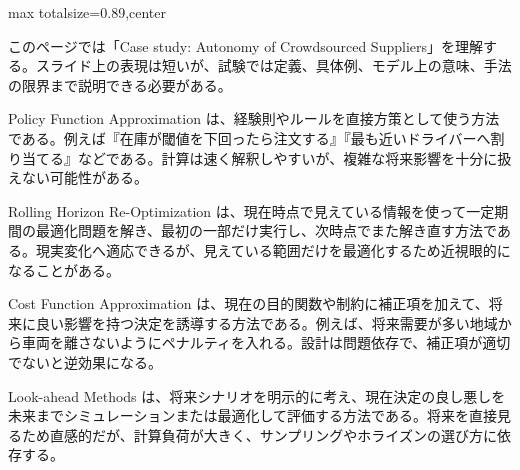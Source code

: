 \begin{minipage}[t]{0.58\textwidth}
\begin{adjustbox}{max totalsize={\textwidth}{0.89\textheight},center}
\begin{minipage}{\textwidth}\scriptsize
{}このページでは「Case study: Autonomy of Crowdsourced Suppliers」を理解する。スライド上の表現は短いが、試験では定義、具体例、モデル上の意味、手法の限界まで説明できる必要がある。\par
Policy Function Approximation は、経験則やルールを直接方策として使う方法である。例えば『在庫が閾値を下回ったら注文する』『最も近いドライバーへ割り当てる』などである。計算は速く解釈しやすいが、複雑な将来影響を十分に扱えない可能性がある。\par
Rolling Horizon Re-Optimization は、現在時点で見えている情報を使って一定期間の最適化問題を解き、最初の一部だけ実行し、次時点でまた解き直す方法である。現実変化へ適応できるが、見えている範囲だけを最適化するため近視眼的になることがある。\par
Cost Function Approximation は、現在の目的関数や制約に補正項を加えて、将来に良い影響を持つ決定を誘導する方法である。例えば、将来需要が多い地域から車両を離さないようにペナルティを入れる。設計は問題依存で、補正項が適切でないと逆効果になる。\par
Look-ahead Methods は、将来シナリオを明示的に考え、現在決定の良し悪しを未来までシミュレーションまたは最適化して評価する方法である。将来を直接見るため直感的だが、計算負荷が大きく、サンプリングやホライズンの選び方に依存する。\par

\end{minipage}
\end{adjustbox}
\end{minipage}
